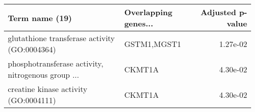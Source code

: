 \begin{tabular}{llr}
\toprule
                                    Term name (19) & Overlapping genes... &  Adjusted p-value \\
\midrule
     glutathione transferase activity (GO:0004364) &          GSTM1,MGST1 &          1.27e-02 \\
phosphotransferase activity, nitrogenous group ... &               CKMT1A &          4.30e-02 \\
             creatine kinase activity (GO:0004111) &               CKMT1A &          4.30e-02 \\
\bottomrule
\end{tabular}
